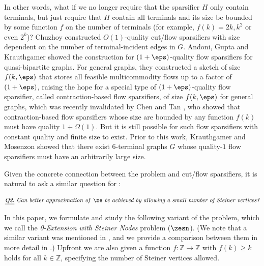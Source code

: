In other words, what if we no longer require that the sparsifier $H$ only contain terminals, but just require that $H$ contain all terminals and its size be bounded by some function $f$ on the number of terminals (for example, $f(k)=2k,k^2$ or even $2^k$)? 
Chuzhoy \cite{chuzhoy2012vertex} constructed $O(1)$-quality cut/flow sparsifiers with size dependent on the number of terminal-incident edges in $G$.
Andoni, Gupta and Krauthgamer \cite{andoni2014towards} showed the construction for $(1+\eps)$-quality flow sparsifiers for quasi-bipartite graphs. For general graphs, they constructed a sketch of size $f(k,\eps)$ that stores all feasible multicommodity flows up to a factor of $(1+\eps)$, raising the hope for a special type of $(1+\eps)$-quality flow sparsifier, called contraction-based flow sparsifiers, of size $f(k,\eps)$ for general graphs, which was recently invalidated by Chen and Tan \cite{chen20241+}, who showed that contraction-based flow sparsifiers whose size are bounded by any function $f(k)$ must have quality $1+\Omega(1)$. But it is still possible for such flow sparsifiers with constant quality and finite size to exist. Prior to this work, Krauthgamer and Mosenzon \cite{krauthgamer2023exact} showed that there exist $6$-terminal graphs $G$ whose quality-$1$ flow sparsifiers must have an arbitrarily large size.

Given the concrete connection between the \ze problem and  cut/flow sparsifiers, it is natural to ask a similar question for \ze: 

\vspace{-10pt}
\[\emph{\underline{Q2.} Can better approximation of \textnormal{\ze} be achieved by allowing a small number of Steiner vertices?}\]
\vspace{-10pt}

In this paper, we formulate and study the following variant of the \ze problem, which we call the \emph{0-Extension with Steiner Nodes} problem ($\zesn$). (We note that a similar variant was mentioned in \cite{andoni2014towards}, and we provide a comparison between them in more detail in .)
Upfront we are also given a function $f: \mathbb{Z}\to \mathbb{Z}$ with $f(k)\ge k$ holds for all $k\in \mathbb{Z}$, specifying the number of Steiner vertices allowed.

\vspace{-10pt}

